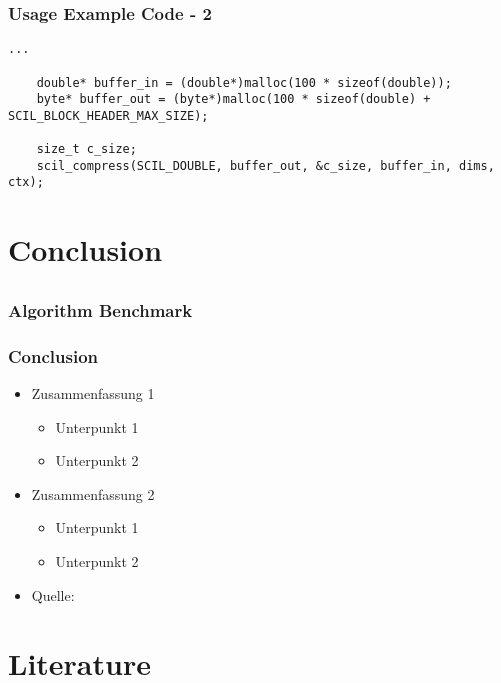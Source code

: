 \documentclass[compress]{beamer}
\begin{document}
\begin{frame}[fragile]
	\frametitle{Usage Example Code - 2}

	\begin{lstlisting}[caption=SCIL usage example - 2]
	...

	double* buffer_in = (double*)malloc(100 * sizeof(double));
	byte* buffer_out = (byte*)malloc(100 * sizeof(double) + SCIL_BLOCK_HEADER_MAX_SIZE);

	size_t c_size;
	scil_compress(SCIL_DOUBLE, buffer_out, &c_size, buffer_in, dims, ctx);
	\end{lstlisting}

\end{frame}

\section{Conclusion}
\subsection*{}

\begin{frame}
	\frametitle{Algorithm Benchmark}

\end{frame}

\begin{frame}
	\frametitle{Conclusion}

	\begin{itemize}
		\item Zusammenfassung 1
		\begin{itemize}
			\item Unterpunkt 1
			\item Unterpunkt 2
		\end{itemize}
		\item Zusammenfassung 2
		\begin{itemize}
			\item Unterpunkt 1
			\item Unterpunkt 2
		\end{itemize}
		\item Quelle: \cite{Quelle2012}
	\end{itemize}
\end{frame}

\section{Literature}
\subsection*{}
\end{document}
